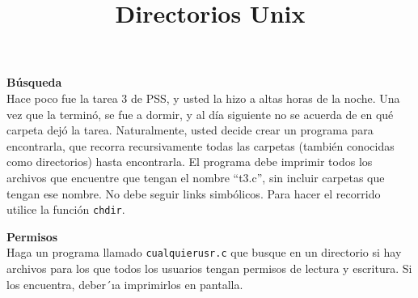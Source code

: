 \documentclass[dcc]{fcfmcourse}
\title[10]{Directorios Unix}
\begin{document}
\maketitle

\begin{problems}

\problem \textbf{Búsqueda}\\
Hace poco fue la tarea 3 de PSS, y usted la hizo a altas horas de la noche. Una vez que la
terminó, se fue a dormir, y al día siguiente no se acuerda de en qué carpeta dejó la tarea.
Naturalmente, usted decide crear un programa para encontrarla, que recorra recursivamente
todas las carpetas (también conocidas como directorios) hasta encontrarla. El programa debe
imprimir todos los archivos que encuentre que tengan el nombre “t3.c”, sin incluir carpetas
que tengan ese nombre. No debe seguir links simbólicos. Para hacer el recorrido utilice la
función \texttt{chdir}.

\problem \textbf{Permisos}\\
Haga un programa llamado \texttt{cualquierusr.c} que busque en un directorio si hay archivos para
los que todos los usuarios tengan permisos de lectura y escritura. Si los encuentra, deber´ıa
imprimirlos en pantalla.


\end{problems}
\end{document}
